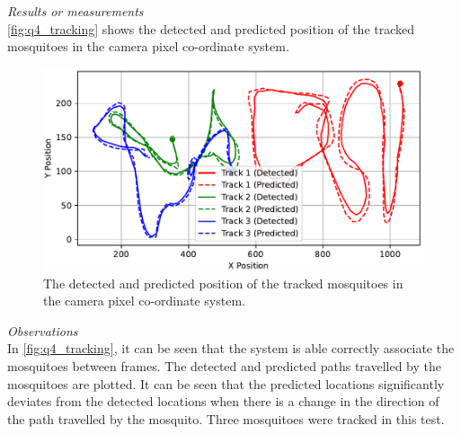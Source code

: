 \textit{Results or measurements}\\
\autoref{fig:q4_tracking} shows the detected and predicted position of the tracked mosquitoes in the camera pixel co-ordinate system.
\begin{figure}[h]
  \centering
  \includegraphics[width=\textwidth]{figures/results/tracking.pdf}
  \caption{The detected and predicted position of the tracked mosquitoes in the camera pixel co-ordinate system.}
  \label{fig:q4_tracking}
\end{figure}

\textit{Observations}\\
In \autoref{fig:q4_tracking}, it can be seen that the system is able correctly associate the mosquitoes between frames. The detected and predicted paths travelled by the mosquitoes are plotted. It can be seen that the predicted locations significantly deviates from the detected locations when there is a change in the direction of the path travelled by the mosquito. Three mosquitoes were tracked in this test.

\newpage



